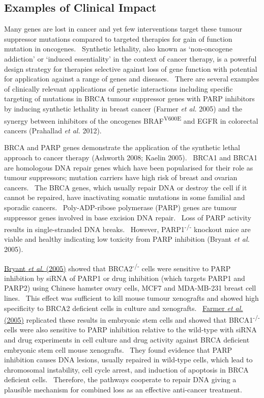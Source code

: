 \subsection[Examples of Clinical Impact]{Examples of Clinical Impact}

Many genes are lost in cancer and yet few interventions target these
tumour suppressor mutations compared to targeted therapies for gain of
function mutation in oncogenes. \ Synthetic lethality, also known as
{\textquoteleft}non-oncogene addiction{\textquoteright} or
{\textquoteleft}induced essentiality{\textquoteright} in the context of
cancer therapy, is a powerful design strategy for therapies selective
against loss of gene function with potential for application against a
range of genes and diseases. \ There are several examples of clinically
relevant applications of genetic interactions including specific
targeting of mutations in BRCA tumour suppressor genes with PARP
inhibitors by inducing synthetic lethality in breast cancer
(Farmer\textit{ et al.} 2005) and the synergy between inhibitors of the
oncogenes BRAF\textsuperscript{V600E} and EGFR in colorectal cancers
(Prahallad\textit{ et al.} 2012).


BRCA and PARP genes demonstrate the application of the synthetic lethal
approach to cancer therapy (Ashworth 2008; Kaelin 2005). \ BRCA1 and
BRCA1 are homologous DNA repair genes which have been popularised for
their role as tumour suppressors; mutation carriers have high risk of
breast and ovarian cancers. \ The BRCA genes, which usually repair DNA
or destroy the cell if it cannot be repaired, have inactivating somatic
mutations in some familial and sporadic cancers. \ Poly-ADP-ribose
polymerase (PARP) genes are tumour suppressor genes involved in base
excision DNA repair. \ Loss of PARP activity results in single-stranded
DNA breaks. \ However, PARP1\textsuperscript{{}-/-}\textsubscript{
}knockout mice are viable and healthy indicating low toxicity from PARP
inhibition (Bryant\textit{ et al.} 2005). \ 


\hyperlink{ENREF19}{Bryant}\hyperlink{ENREF19}{\textit{ et
al.}}\hyperlink{ENREF19}{ (2005)} showed that
BRCA2\textsuperscript{{}-/-} cells were sensitive to PARP inhibition by
siRNA of PARP1 or drug inhibition (which targets PARP1 and PARP2) using
Chinese hamster ovary cells, MCF7 and MDA-MB-231 breast cell lines.
\ This effect was sufficient to kill mouse tumour xenografts and showed
high specificity to BRCA2 deficient cells in culture and xenografts.
\ \hyperlink{ENREF39}{Farmer}\hyperlink{ENREF39}{\textit{ et
al.}}\hyperlink{ENREF39}{ (2005)} replicated these results in embryonic
stem cells and showed that BRCA1\textsuperscript{{}-/-} cells were also
sensitive to PARP inhibition relative to the wild-type with siRNA and
drug experiments in cell culture and drug activity against BRCA
deficient embryonic stem cell mouse xenografts. \ They found evidence
that PARP inhibition causes DNA lesions, usually repaired in wild-type
cells, which lead to chromosomal instability, cell cycle arrest, and
induction of apoptosis in BRCA deficient cells. \ Therefore, the
pathways cooperate to repair DNA giving a plausible mechanism for
combined loss as an effective anti-cancer treatment. \ 


